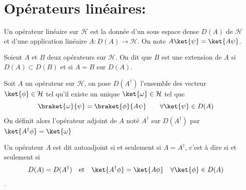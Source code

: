 \section{Opérateurs linéaires:}

\begin{defi}
Un opérateur linéaire sur $\mathcal{H}$ est la donnée d'un sous espace dense $D(A)$ de $\mathcal{H}$ et d'une application linéaire $A: D(A) \to \mathcal{H}$. On note $A\ket{\psi} = \ket{A\psi}$.
\end{defi}

\begin{defi}
Soient $A$ et $B$ deux opérateurs sur $\mathcal{H}$. On dit que $B$ est une extension de $A$ si $D(A) \subset D(B)$ et si $A = B$ sur $D(A)$.
\end{defi} 

\begin{defi}[Adjoint]
Soit $A$ un opérateur sur $\mathcal{H}$, on pose $D(A^\dagger)$ l'ensemble des vecteur $\ket{\phi} \in \mathcal{H}$ tel qu'il existe un unique $\ket{\omega} \in \mathcal{H}$ tel que
$$\braket{\omega}{\psi} = \braket{\phi}{A\psi} \qquad \forall \ket{\psi} \in D(A)$$
On définit alors l'opérateur adjoint de $A$ noté $A^\dagger$ sur $D(A^\dagger)$ par $\ket{A^\dagger\phi} = \ket{\omega}$
\end{defi}

\begin{defi}
Un opérateur $A$ est dit autoadjoint si et seulement si $A = A^\dagger$, c'est à dire si et seulement si 
$$D(A) = D(A^\dagger) \quad \text{et} \quad 
\ket{A^\dagger\phi} = \ket{A\phi} \quad \forall \ket{\phi}\in D(A)$$.
\end{defi}